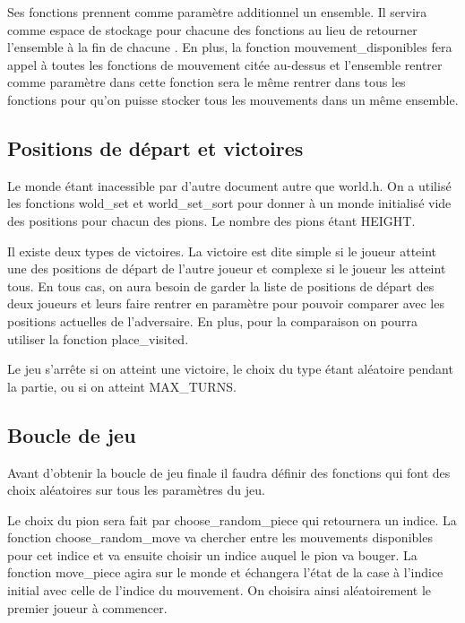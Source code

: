 \documentclass[a4paper]{article}
\begin{document}
Ses fonctions prennent comme paramètre additionnel un ensemble. Il servira comme espace de stockage pour chacune des fonctions au lieu de retourner l’ensemble à la fin de chacune . En plus, la fonction mouvement\_disponibles fera appel à toutes les fonctions de mouvement citée au-dessus et l’ensemble rentrer comme paramètre dans cette fonction sera le même rentrer dans tous les fonctions pour qu’on puisse stocker tous les mouvements dans un même ensemble.  
\subsection{Positions de départ et victoires}
Le monde étant inacessible par d’autre document autre que world.h. On a utilisé les fonctions wold\_set et world\_set\_sort pour donner à un monde initialisé vide des positions pour chacun des pions. Le nombre des pions étant HEIGHT.  

Il existe deux types de victoires. La victoire est dite simple si le joueur atteint une des positions de départ de l’autre joueur et complexe si le joueur les atteint tous. En tous cas, on aura besoin de garder la liste de positions de départ des deux joueurs et leurs faire rentrer en paramètre pour pouvoir comparer avec les positions actuelles de l’adversaire. En plus, pour la comparaison on pourra utiliser la fonction place\_visited. 

Le jeu s’arrête si on atteint une victoire, le choix du type étant aléatoire pendant la partie, ou si on atteint MAX\_TURNS. 
\subsection{Boucle de jeu}
Avant d’obtenir la boucle de jeu finale il faudra définir des fonctions qui font des choix aléatoires sur tous les paramètres du jeu. 

Le choix du pion sera fait par choose\_random\_piece qui retournera un indice. La fonction choose\_random\_move va chercher entre les mouvements disponibles pour cet indice et va ensuite choisir un indice auquel le pion va bouger. La fonction move\_piece agira sur le monde et échangera l’état de la case à l’indice initial avec celle de l’indice du mouvement. On choisira ainsi aléatoirement le premier joueur à commencer. 
\end{document}
